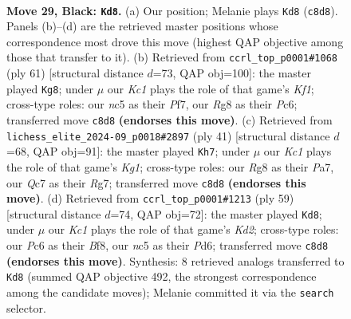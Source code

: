 \documentclass[11pt]{article}
\begin{document}
\clearpage

\begin{figure}[p]\centering
\begin{subfigure}{0.46\textwidth}\centering
\resizebox{\linewidth}{!}{%
\newchessgame
\chessboard[
  setfen={r1k3r1/p1q2p1p/Q1p5/2Nb4/8/3P4/5PPP/2R3K1 b - - 4 29},
  showmover=false,
  pgfstyle=straightmove, color=movearrow, markmove={c8-d8}
]}
\caption{}
\end{subfigure}\hfill
\begin{subfigure}{0.46\textwidth}\centering
\resizebox{\linewidth}{!}{%
\newchessgame
\chessboard[
  setfen={2r2k2/5p2/p1p4Q/4Pp1p/2b5/4P3/P2R1KPq/8 b - - 3 31},
  showmover=false,
  pgfstyle=straightmove, color=movearrow, markmove={f8-g8}
]}
\caption{}
\end{subfigure}
\\[4pt]
\begin{subfigure}{0.46\textwidth}\centering
\resizebox{\linewidth}{!}{%
\newchessgame
\chessboard[
  setfen={r5k1/pp4r1/1qp1Q3/4p2p/4P2P/2N5/PPP3P1/2K2R1n b - - 0 21},
  showmover=false,
  pgfstyle=straightmove, color=movearrow, markmove={g8-h7}
]}
\caption{}
\end{subfigure}\hfill
\begin{subfigure}{0.46\textwidth}\centering
\resizebox{\linewidth}{!}{%
\newchessgame
\chessboard[
  setfen={5b1r/3k1pp1/3p4/1Q6/4P1qp/2N3P1/P1P2K2/7R b - - 9 30},
  showmover=false,
  pgfstyle=straightmove, color=movearrow, markmove={d7-d8}
]}
\caption{}
\end{subfigure}
\caption{\textbf{Move 29, Black: \texttt{Kd8}.} (a) Our position; Melanie plays \texttt{Kd8} (\texttt{c8d8}). Panels (b)--(d) are the retrieved master positions whose correspondence most drove this move (highest QAP objective among those that transfer to it). (b) Retrieved from \texttt{ccrl\_top\_p0001\#1068} (ply 61) [structural distance $d$=73, QAP obj=100]: the master played \texttt{Kg8}; under $\mu$ our \emph{Kc1} plays the role of that game's \emph{Kf1}; cross-type roles: our \emph{n}c5 as their \emph{P}f7, our \emph{R}g8 as their \emph{P}c6; transferred move \texttt{c8d8} \textbf{(endorses this move)}. (c) Retrieved from \texttt{lichess\_elite\_2024-09\_p0018\#2897} (ply 41) [structural distance $d$=68, QAP obj=91]: the master played \texttt{Kh7}; under $\mu$ our \emph{Kc1} plays the role of that game's \emph{Kg1}; cross-type roles: our \emph{R}g8 as their \emph{P}a7, our \emph{Q}c7 as their \emph{R}g7; transferred move \texttt{c8d8} \textbf{(endorses this move)}. (d) Retrieved from \texttt{ccrl\_top\_p0001\#1213} (ply 59) [structural distance $d$=74, QAP obj=72]: the master played \texttt{Kd8}; under $\mu$ our \emph{Kc1} plays the role of that game's \emph{Kd2}; cross-type roles: our \emph{P}c6 as their \emph{B}f8, our \emph{n}c5 as their \emph{P}d6; transferred move \texttt{c8d8} \textbf{(endorses this move)}. Synthesis: 8 retrieved analogs transferred to \texttt{Kd8} (summed QAP objective 492, the strongest correspondence among the candidate moves); Melanie committed it via the \texttt{search} selector.}
\label{fig:thought-m57}
\end{figure}
\end{document}
